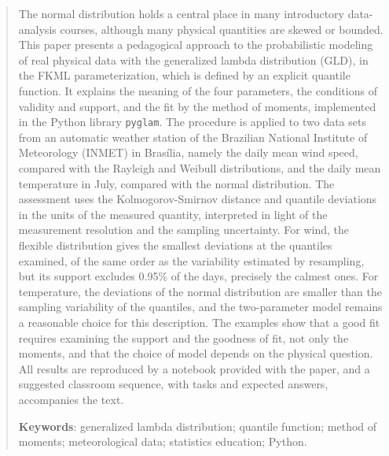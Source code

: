 \begin{abstract}
The normal distribution holds a central place in many introductory data-analysis courses, although many physical quantities are skewed or bounded. This paper presents a pedagogical approach to the probabilistic modeling of real physical data with the generalized lambda distribution (GLD), in the FKML parameterization, which is defined by an explicit quantile function. It explains the meaning of the four parameters, the conditions of validity and support, and the fit by the method of moments, implemented in the Python library \texttt{pyglam}. The procedure is applied to two data sets from an automatic weather station of the Brazilian National Institute of Meteorology (INMET) in Brasília, namely the daily mean wind speed, compared with the Rayleigh and Weibull distributions, and the daily mean temperature in July, compared with the normal distribution. The assessment uses the Kolmogorov-Smirnov distance and quantile deviations in the units of the measured quantity, interpreted in light of the measurement resolution and the sampling uncertainty. For wind, the flexible distribution gives the smallest deviations at the quantiles examined, of the same order as the variability estimated by resampling, but its support excludes 0.95\% of the days, precisely the calmest ones. For temperature, the deviations of the normal distribution are smaller than the sampling variability of the quantiles, and the two-parameter model remains a reasonable choice for this description. The examples show that a good fit requires examining the support and the goodness of fit, not only the moments, and that the choice of model depends on the physical question. All results are reproduced by a notebook provided with the paper, and a suggested classroom sequence, with tasks and expected answers, accompanies the text.

\medskip
\noindent\textbf{Keywords}: generalized lambda distribution; quantile function; method of moments; meteorological data; statistics education; Python.
\end{abstract}

